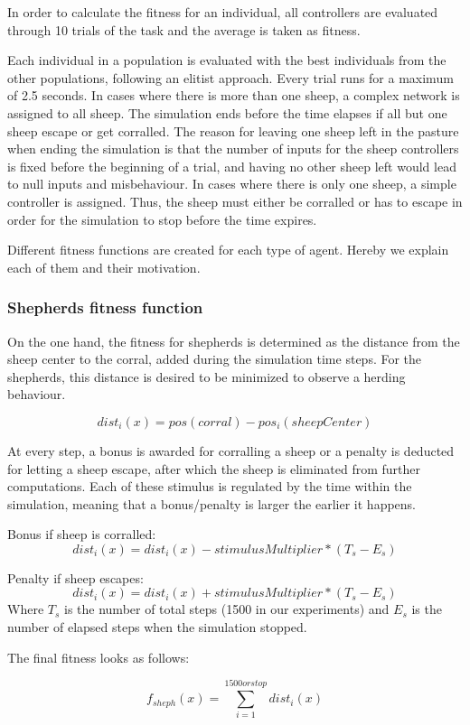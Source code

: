 \documentclass[conference]{IEEEtran}
\begin{document}
In order to calculate the fitness for an individual, all controllers are evaluated through 10 trials of the task and the average is taken as fitness.

Each individual in a population is evaluated with the best individuals from the other populations, following an elitist approach.
Every trial runs for a maximum of 2.5 seconds. In cases where there is more than one sheep, a complex network is assigned to all sheep. The simulation ends before the time elapses if all but one sheep escape or get corralled. The reason for leaving one sheep left in the pasture when ending the simulation is that the number of inputs for the sheep controllers is fixed before the beginning of a trial, and having no other sheep left would lead to null inputs and misbehaviour. In cases where there is only one sheep, a simple controller is assigned. Thus, the sheep must either be corralled or has to escape in order for the simulation to stop before the time expires.

Different fitness functions are created for each type of agent. Hereby we explain each of them and their motivation.

\subsubsection{Shepherds fitness function}
On the one hand, the fitness for shepherds is determined as the distance from the sheep center to the corral, added during the simulation time steps. For the shepherds, this distance is desired to be minimized to observe a herding behaviour.  

$$ dist_i(x) = pos(corral) - pos_i(sheepCenter) $$

At every step, a bonus  is awarded for corralling a sheep or a penalty is deducted for letting a sheep escape, after which the sheep is eliminated from further computations. Each of these stimulus is regulated by the time within the simulation, meaning that a bonus/penalty is larger the earlier it happens. 

Bonus if sheep is corralled:
$$ dist_i(x) = dist_i(x) - stimulusMultiplier * (T_s - E_s) $$

Penalty if sheep escapes:
$$ dist_i(x) = dist_i(x) + stimulusMultiplier * (T_s - E_s) $$
Where $T_s$ is the number of total steps (1500 in our experiments) and $E_s$ is the number of elapsed steps when the simulation stopped.

The final fitness looks as follows: 

$$ f_{sheph}(x) = \sum_{i=1}^{1500 or stop} dist_i(x) $$
\end{document}
